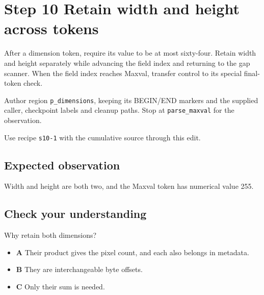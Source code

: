 \section{Step 10 Retain width and height across tokens}\label{ppm-s10}

After a dimension token, require its value to be at most sixty-four. Retain width and height separately while advancing the field index and returning to the gap scanner. When the field index reaches Maxval, transfer control to its special final-token check.

Author region \texttt{p\_dimensions}, keeping its BEGIN/END markers and the supplied caller, checkpoint labels and cleanup paths. Stop at \texttt{parse\_maxval} for the observation.

Use recipe \texttt{s10-1} with the cumulative source through this edit.

\subsection{Expected observation}
Width and height are both two, and the Maxval token has numerical value 255.

\subsection{Check your understanding}
Why retain both dimensions?

\begin{itemize}
\item \textbf{A} Their product gives the pixel count, and each also belongs in metadata.
\item \textbf{B} They are interchangeable byte offsets.
\item \textbf{C} Only their sum is needed.
\end{itemize}
